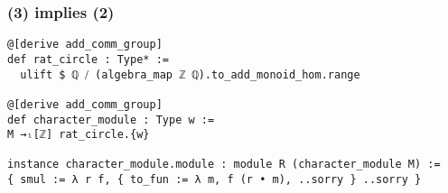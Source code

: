 \documentclass[aspectratio=169]{beamer}
\begin{document}
\begin{frame}[fragile]
\frametitle{(3) implies (2)}
\begin{minipage}{0.1\textwidth}
\end{minipage}%
\begin{minipage}{0.9\textwidth}
\begin{lstlisting}
@[derive add_comm_group]
def rat_circle : Type* :=
  ulift $ ℚ ⧸ (algebra_map ℤ ℚ).to_add_monoid_hom.range

@[derive add_comm_group]
def character_module : Type w :=
M →ₗ[ℤ] rat_circle.{w}

instance character_module.module : module R (character_module M) :=
{ smul := λ r f, { to_fun := λ m, f (r • m), ..sorry } ..sorry }
\end{lstlisting}
\end{minipage}%

\end{frame}
\end{document}
